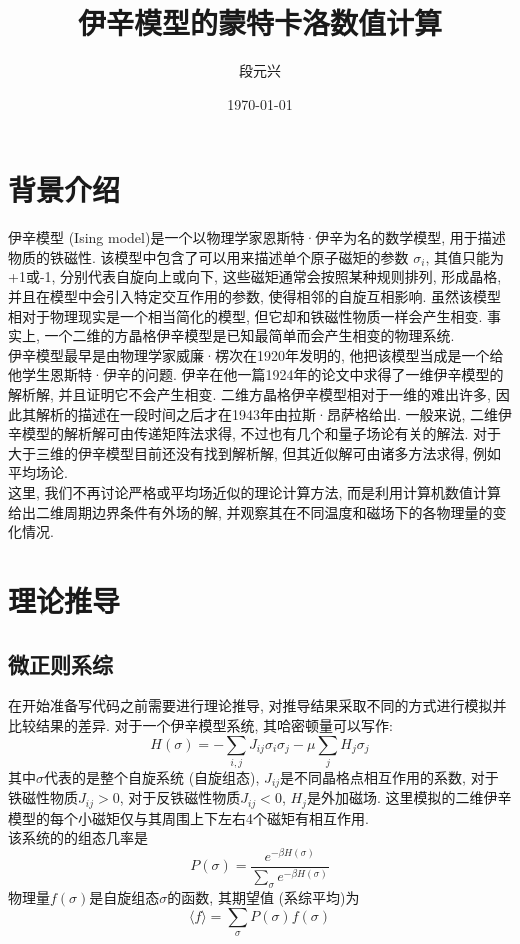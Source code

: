 \documentclass[UTF8]{ctexart}
\title{伊辛模型的蒙特卡洛数值计算}
\author{段元兴}
\date{\today}
\begin{document}
\maketitle
\thispagestyle{empty}
\setcounter{page}{1}
\newpage
\tableofcontents
\newpage
    \section{背景介绍}
        \indent 伊辛模型 (Ising model)是一个以物理学家恩斯特·伊辛为名的数学模型, 用于描述物质的铁磁性.
        该模型中包含了可以用来描述单个原子磁矩的参数 $\sigma _{i}$, 其值只能为+1或-1, 分别代表自旋向上或向下,
        这些磁矩通常会按照某种规则排列, 形成晶格, 并且在模型中会引入特定交互作用的参数, 使得相邻的自旋互相影响.
        虽然该模型相对于物理现实是一个相当简化的模型, 但它却和铁磁性物质一样会产生相变.
        事实上, 一个二维的方晶格伊辛模型是已知最简单而会产生相变的物理系统.\\
        \indent 伊辛模型最早是由物理学家威廉·楞次在1920年发明的, 他把该模型当成是一个给他学生恩斯特·伊辛的问题.
        伊辛在他一篇1924年的论文中求得了一维伊辛模型的解析解, 并且证明它不会产生相变. 二维方晶格伊辛模型相对于一维的难出许多,
        因此其解析的描述在一段时间之后才在1943年由拉斯·昂萨格给出. 一般来说, 二维伊辛模型的解析解可由传递矩阵法求得,
        不过也有几个和量子场论有关的解法. 对于大于三维的伊辛模型目前还没有找到解析解, 但其近似解可由诸多方法求得, 例如平均场论.\\
        \indent 这里, 我们不再讨论严格或平均场近似的理论计算方法, 而是利用计算机数值计算给出二维周期边界条件有外场的解,
        并观察其在不同温度和磁场下的各物理量的变化情况.
    \section{理论推导}
        \subsection{微正则系综}
            \indent 在开始准备写代码之前需要进行理论推导, 对推导结果采取不同的方式进行模拟并比较结果的差异. 对于一个伊辛模型系统,
            其哈密顿量可以写作:
            \begin{equation}
                H(\sigma)=-\sum\limits_{i,j}J_{ij}\sigma_i\sigma_j-\mu\sum\limits_jH_j\sigma_j
            \end{equation}
            其中$\sigma$代表的是整个自旋系统 (自旋组态), $J_{ij}$是不同晶格点相互作用的系数, 对于铁磁性物质$J_{ij}>0$, 对于反铁磁性物质$J_{ij}<0$,
            $H_j$是外加磁场. 这里模拟的二维伊辛模型的每个小磁矩仅与其周围上下左右4个磁矩有相互作用.\\
            \indent 该系统的的组态几率是
            \begin{equation}
                P(\sigma)=\dfrac{e^{-\beta H(\sigma)}}{\sum\limits_\sigma e^{-\beta H(\sigma)}}
            \end{equation}
            物理量$f(\sigma)$是自旋组态$\sigma$的函数, 其期望值 (系综平均)为
            \begin{equation}
                \langle f\rangle=\sum\limits_\sigma P(\sigma)f(\sigma)
            \end{equation}
\end{document}
